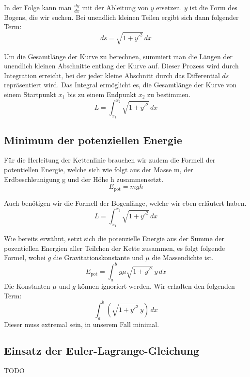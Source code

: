 In der Folge kann man \(\frac{dy}{dx}\) mit der Ableitung von \(y\) ersetzen.
\(y\) ist die Form des Bogens, die wir suchen.
Bei unendlich kleinen Teilen ergibt sich dann folgender Term:
\begin{equation}
	ds
	=
	\sqrt{1 + y'^2} \, dx
\end{equation}

Um die Gesamtlänge der Kurve zu berechnen, summiert man die Längen der unendlich kleinen Abschnitte entlang der Kurve auf.
Dieser Prozess wird durch Integration erreicht, bei der jeder kleine Abschnitt durch das Differential \(ds\) repräsentiert wird.
Das Integral ermöglicht es, die Gesamtlänge der Kurve von einem Startpunkt \(x_1\) bis zu einem Endpunkt \(x_2\) zu bestimmen.
\begin{equation}
	L
	=
	\int_{x_1}^{x_2} \sqrt{1 + y'^2} \, dx
\end{equation}

\subsection{Minimum der potenziellen Energie
\label{kettenlinie:subsection:Minimum der potenziellen Energie}}
Für die Herleitung der Kettenlinie brauchen wir zudem die Formell der potentiellen Energie, welche sich wie folgt aus der Masse m, der Erdbeschleunigung g und der Höhe h zusammensetzt.
\begin{equation}
	E_{\text{pot}}
	=
	mgh
\end{equation}

Auch benötigen wir die Formell der Bogenlänge, welche wir eben erläutert haben.
\begin{equation}
	L
	=
	\int_{x_1}^{x_2} \sqrt{1 + y'^2} \, dx
\end{equation}

Wie bereits erwähnt, setzt sich die potenzielle Energie aus der Summe der pozentiellen Energien aller Teilchen der Kette zusammen, es folgt folgende Formel, wobei \(g\) die Gravitationskonstante und \(\mu\) die Massendichte ist.
\begin{equation}
	E_{\text{pot}}
	=
	\int_{a}^{b} g \mu \sqrt{1 + y'^2} \, y \, dx
\end{equation}
Die Konstanten \(\mu\) und \(g\) können ignoriert werden.
Wir erhalten den folgenden Term:
\begin{equation}
	\int_{a}^{b} (\sqrt{1 + y'^2} \, y) \, dx
\end{equation}
Dieser muss extremal sein, in unserem Fall minimal.

\subsection{Einsatz der Euler-Lagrange-Gleichung
\label{kettenlinie:subsection:Einsatz der Euler-Lagrange-Gleichung}}
TODO